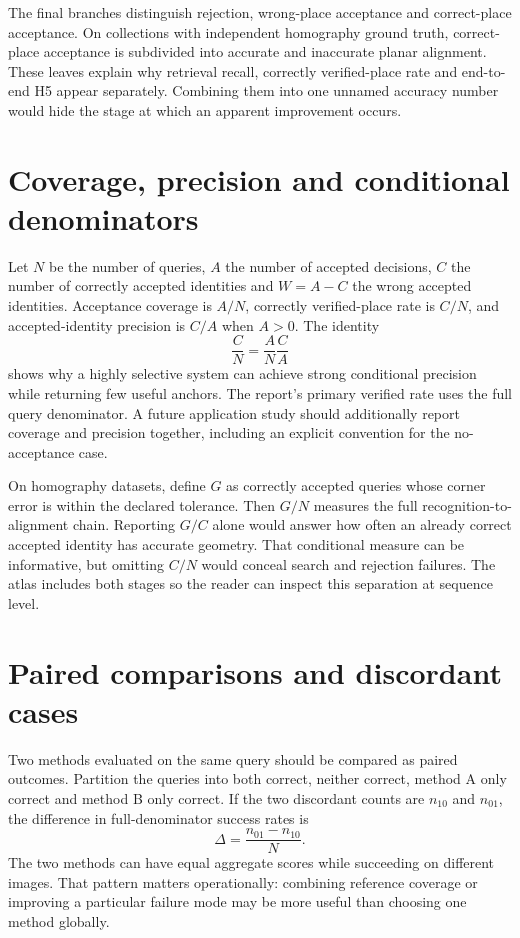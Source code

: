 The final branches distinguish rejection, wrong-place acceptance and correct-place acceptance. On collections with independent homography ground truth, correct-place acceptance is subdivided into accurate and inaccurate planar alignment. These leaves explain why retrieval recall, correctly verified-place rate and end-to-end H5 appear separately. Combining them into one unnamed accuracy number would hide the stage at which an apparent improvement occurs.

\section{Coverage, precision and conditional denominators}
Let $N$ be the number of queries, $A$ the number of accepted decisions, $C$ the number of correctly accepted identities and $W=A-C$ the wrong accepted identities. Acceptance coverage is $A/N$, correctly verified-place rate is $C/N$, and accepted-identity precision is $C/A$ when $A>0$. The identity
\begin{equation}
 \frac{C}{N}=\frac{A}{N}\frac{C}{A}
\end{equation}
shows why a highly selective system can achieve strong conditional precision while returning few useful anchors. The report's primary verified rate uses the full query denominator. A future application study should additionally report coverage and precision together, including an explicit convention for the no-acceptance case.

On homography datasets, define $G$ as correctly accepted queries whose corner error is within the declared tolerance. Then $G/N$ measures the full recognition-to-alignment chain. Reporting $G/C$ alone would answer how often an already correct accepted identity has accurate geometry. That conditional measure can be informative, but omitting $C/N$ would conceal search and rejection failures. The atlas includes both stages so the reader can inspect this separation at sequence level.

\section{Paired comparisons and discordant cases}
Two methods evaluated on the same query should be compared as paired outcomes. Partition the queries into both correct, neither correct, method A only correct and method B only correct. If the two discordant counts are $n_{10}$ and $n_{01}$, the difference in full-denominator success rates is
\begin{equation}
 \Delta=\frac{n_{01}-n_{10}}{N}.
\end{equation}
The two methods can have equal aggregate scores while succeeding on different images. That pattern matters operationally: combining reference coverage or improving a particular failure mode may be more useful than choosing one method globally.

